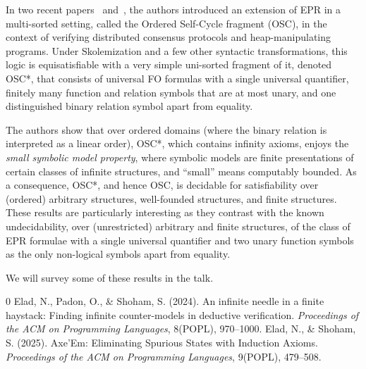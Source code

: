 \documentclass[a4paper,UKenglish]{dagrep-v2021}
\begin{document}
In two recent papers~\cite{elad-popl24} and~\cite{elad-popl25}, the authors introduced an extension of EPR in a multi-sorted setting, called the Ordered Self-Cycle fragment (OSC), in the context of verifying distributed consensus protocols and heap-manipulating programs. Under Skolemization and a few other syntactic transformations, this logic is equisatisfiable with a very simple uni-sorted fragment of it, denoted OSC*, that consists of universal FO formulas with a single universal quantifier, finitely many function and relation symbols that are at most unary, and one distinguished binary relation symbol apart from equality.

The authors show that over ordered domains (where the binary relation is interpreted as a linear order), OSC*, which contains infinity axioms, enjoys the \emph{small symbolic model property}, where symbolic models are finite presentations of certain classes of infinite structures, and ``small'' means computably bounded. As a consequence, OSC*, and hence OSC, is decidable for satisfiability over (ordered) arbitrary structures, well-founded structures, and finite structures. These results are particularly interesting as they contrast with the known undecidability, over (unrestricted) arbitrary and finite structures, of the class of EPR formulae with a single universal quantifier and two unary function symbols as the only non-logical symbols apart from equality.

We will survey some of these results in the talk.

\begin{thebibliography}{0}
 Elad, N., Padon, O., \& Shoham, S. (2024). An infinite needle in a finite haystack: Finding infinite counter-models in deductive verification. \textsl{Proceedings of the ACM on Programming Languages}, 8(POPL), 970--1000.
 Elad, N., \& Shoham, S. (2025). Axe'Em: Eliminating Spurious States with Induction Axioms. \textsl{Proceedings of the ACM on Programming Languages}, 9(POPL), 479--508.
\end{thebibliography}

\newpage
\end{document}
